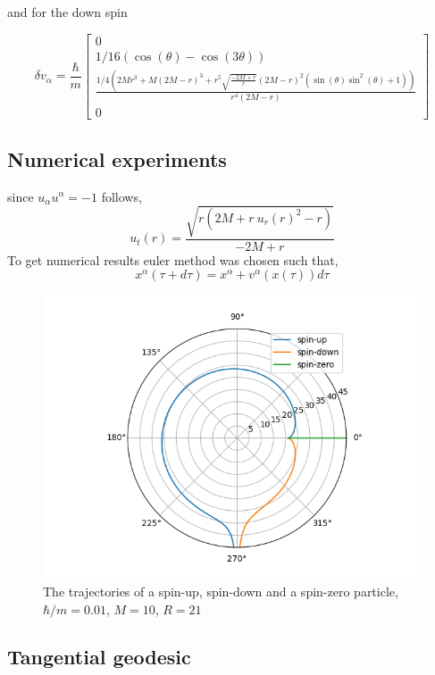 \documentclass[12pt,a4paper]{article}
\begin{document}
	and for the down spin
	
	$$
	\delta v_\alpha = \frac{\hbar}{m}\left[\begin{matrix}0\\1/16 \left( \cos{\left(\theta\right)} - \cos{\left(3\theta \right)}\right)\\\frac{1/4  \left(2 M r^{3} + M  \left(2 M - r\right)^{3} + r^{5} \sqrt{\frac{- 2 M + r}{r}} \left(2 M - r\right)^{2} \left(\sin{\left(\theta \right)} \sin^{2}{\left(\theta \right)} + 1\right)\right)}{r^{4}  \left(2 M - r\right)}\\0\end{matrix}\right]
	$$
	
	\subsection{Numerical experiments}
	since $u_\alpha u^\alpha = -1$ follows,
	$$
	u_t(r) = \frac{\sqrt{r \left(2 M + r \ {u_{r}(r)}^{2} - r\right)}}{- 2 M + r} 
	$$
	To get numerical results euler method was chosen such that,
		$$
	x^\alpha(\tau + d\tau) = x^\alpha + v^\alpha(x(\tau))d\tau
	$$
	
	\begin{figure}
		\includegraphics[width=\linewidth]{trajectory.png}
		\caption{The trajectories of a spin-up, spin-down and a spin-zero particle, $\hbar /m = 0.01$, $M=10$, $R=21$}
		\label{fig:trajectories}
	\end{figure}
	
	\subsection{Tangential geodesic}
	
\end{document}
